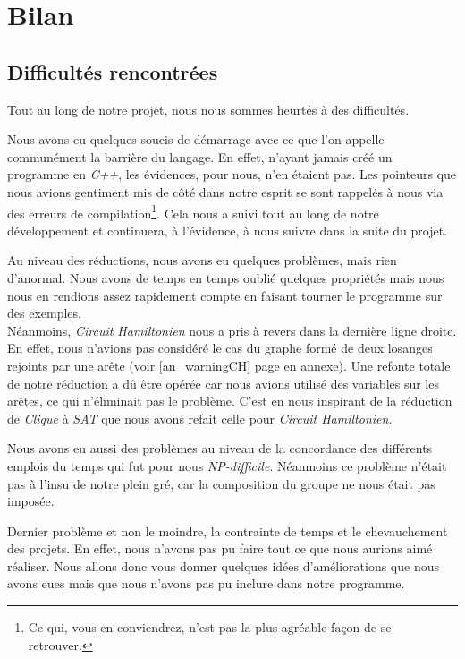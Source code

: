  \section{Bilan}
 
  \subsection{Difficultés rencontrées}
  Tout au long de notre projet, nous nous sommes heurtés à des
  difficultés.

  Nous avons eu quelques soucis de démarrage avec ce que l'on appelle
  communément la barrière du langage. En effet, n'ayant jamais créé un
  programme en \emph{C++}, les évidences, pour nous, n'en étaient
  pas. Les pointeurs que nous avions gentiment mis de côté dans notre
  esprit se sont rappelés à nous via des erreurs de
  compilation\footnote{Ce qui, vous en conviendrez, n'est pas la plus
  agréable façon de se retrouver.}. Cela nous a suivi tout au long de
  notre développement et continuera, à l'évidence, à nous suivre dans la
  suite du projet. 

  Au niveau des réductions, nous avons eu quelques problèmes, mais rien
  d'anormal. Nous avons de temps en temps oublié quelques propriétés
  mais nous nous en rendions assez rapidement compte en faisant tourner
  le programme sur des exemples.\\
  Néanmoins, \emph{Circuit Hamiltonien} nous a pris à revers dans la
  dernière ligne droite. En effet, nous n'avions pas considéré le cas du
  graphe formé de deux losanges rejoints par une arête (voir
  \ref{an_warningCH} page \pageref{an_warningCH} en annexe). Une refonte
  totale de notre réduction a dû être opérée car nous avions utilisé des
  variables sur les arêtes, ce qui n'éliminait pas le problème. C'est en
  nous inspirant de la réduction de \emph{Clique} à \emph{SAT} que nous
  avons refait celle pour \emph{Circuit Hamiltonien}.

  Nous avons eu aussi des problèmes au niveau de la concordance des
  différents emplois du temps qui fut pour nous
  \emph{NP-difficile}. Néanmoins ce problème n'était pas à l'insu de
  notre plein gré, car la composition du groupe ne nous était pas
  imposée.

  Dernier problème et non le moindre, la contrainte de temps et le
  chevauchement des projets. En effet, nous n'avons pas pu faire tout ce
  que nous aurions aimé réaliser. Nous allons donc vous donner quelques
  idées d'améliorations que nous avons eues mais que nous n'avons pas pu
  inclure dans notre programme.
  

